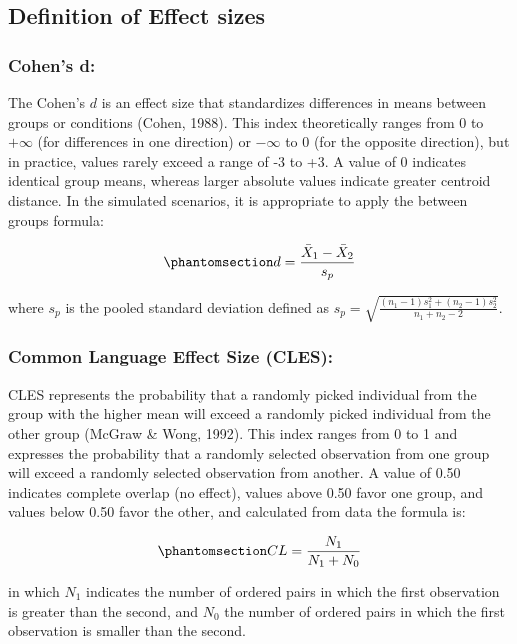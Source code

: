 \documentclass[
  12pt,
  a4paper,
  DIV=11,
  numbers=noendperiod]{scrartcl}
\begin{document}
\subsection{Definition of Effect
sizes}\label{definition-of-effect-sizes}

\subsubsection{Cohen's d:}\label{cohens-d}

The Cohen's \(d\) is an effect size that standardizes differences in
means between groups or conditions (Cohen, 1988). This index
theoretically ranges from 0 to \(+\infty\) (for differences in one
direction) or \(-\infty\) to 0 (for the opposite direction), but in
practice, values rarely exceed a range of -3 to +3. A value of 0
indicates identical group means, whereas larger absolute values indicate
greater centroid distance. In the simulated scenarios, it is appropriate
to apply the between groups formula:

\begin{equation}\phantomsection\label{eq-d}{
d = \frac{\bar{X}_1 - \bar{X}_2}{s_p}
}\end{equation}

where \({s_p}\) is the pooled standard deviation defined as
\(s_p = \sqrt{\frac{(n_1 - 1)s_1^{2} + (n_2 - 1)s_2^{2}}{n_1 + n_2 - 2}}\).

\subsubsection{Common Language Effect Size
(CLES):}\label{common-language-effect-size-cles}

CLES represents the probability that a randomly picked individual from
the group with the higher mean will exceed a randomly picked individual
from the other group (McGraw \& Wong, 1992). This index ranges from 0 to
1 and expresses the probability that a randomly selected observation
from one group will exceed a randomly selected observation from another.
A value of 0.50 indicates complete overlap (no effect), values above
0.50 favor one group, and values below 0.50 favor the other, and
calculated from data the formula is:

\begin{equation}\phantomsection\label{eq-CLdata}{
CL = \frac{N_1}{N_1+N_0}
}\end{equation}

in which \(N_1\) indicates the number of ordered pairs in which the
first observation is greater than the second, and \(N_0\) the number of
ordered pairs in which the first observation is smaller than the second.
\end{document}
